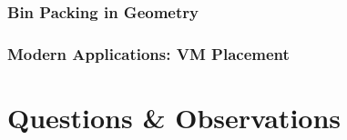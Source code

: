 \documentclass[10pt,    %
    english,            %
    xcolor=table,       %
    envcountsect,        %
    aspectratio=169     %
]{beamer}
\begin{document}
\begin{frame}
    \frametitle{Bin Packing in Geometry}

\end{frame}

\begin{frame}
    \frametitle{Modern Applications: VM Placement}

\end{frame}


\section{Questions \& Observations}
\sectionframe
\end{document}
